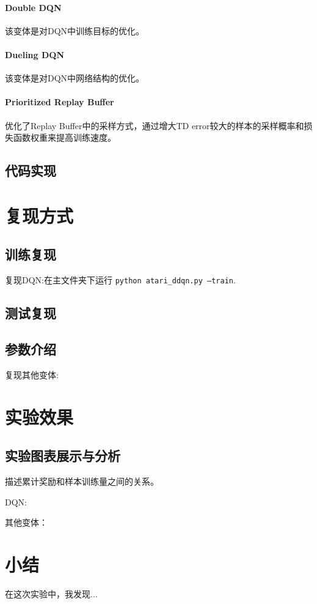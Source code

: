 \documentclass[a4paper,12pt]{article}
\begin{document}
\begin{CJK}{UTF8}{gbsn}
\paragraph{Double DQN} 该变体是对DQN中训练目标的优化。
\paragraph{Dueling DQN} 该变体是对DQN中网络结构的优化。
\paragraph{Prioritized Replay Buffer} 优化了Replay Buffer中的采样方式，通过增大TD error较大的样本的采样概率和损失函数权重来提高训练速度。
\subsection{代码实现}
\section{复现方式}
\subsection{训练复现}
复现DQN:在主文件夹下运行 \texttt{python atari\_ddqn.py --train}.
\subsection{测试复现}
\subsection{参数介绍}
\noindent 复现其他变体:
\section{实验效果}
\subsection{实验图表展示与分析}
描述累计奖励和样本训练量之间的关系。

\noindent DQN:

\noindent 其他变体：

\section{小结}
在这次实验中，我发现...


\end{CJK}
\end{document}

